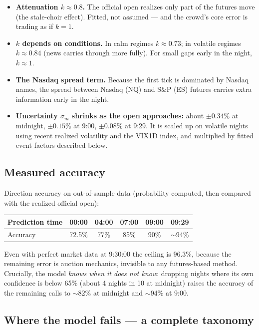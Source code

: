 \documentclass[11pt,a4paper]{article}
\begin{document}
\begin{itemize}
\item \textbf{Attenuation $k \approx 0.8$.} The official open realizes only
part of the futures move (the stale-choir effect). Fitted, not assumed ---
and the crowd's core error is trading as if $k=1$.
\item \textbf{$k$ depends on conditions.} In calm regimes $k\approx0.73$; in
volatile regimes $k\approx0.84$ (news carries through more fully). For small
gaps early in the night, $k\approx1$.
\item \textbf{The Nasdaq spread term.} Because the first tick is dominated by
Nasdaq names, the spread between Nasdaq (NQ) and S\&P (ES) futures carries
extra information early in the night.
\item \textbf{Uncertainty $\sigma_m$ shrinks as the open approaches:} about
$\pm0.34\%$ at midnight, $\pm0.15\%$ at 9:00, $\pm0.08\%$ at 9:29. It is
scaled up on volatile nights using recent realized volatility and the VIX1D
index, and multiplied by fitted event factors described below.
\end{itemize}

\subsection{Measured accuracy}

Direction accuracy on out-of-sample data (probability computed, then compared
with the realized official open):

\begin{center}
\begin{tabular}{lccccc}
\toprule
Prediction time & 00:00 & 04:00 & 07:00 & 09:00 & 09:29 \\
\midrule
Accuracy & 72.5\% & 77\% & 85\% & 90\% & $\sim$94\% \\
\bottomrule
\end{tabular}
\end{center}

Even with perfect market data at 9:30:00 the ceiling is 96.3\%, because the
remaining error is auction mechanics, invisible to any futures-based method.
Crucially, the model \emph{knows when it does not know}: dropping nights where
its own confidence is below 65\% (about 4 nights in 10 at midnight) raises the
accuracy of the remaining calls to $\sim$82\% at midnight and $\sim$94\% at 9:00.

\subsection{Where the model fails --- a complete taxonomy}
\end{document}
